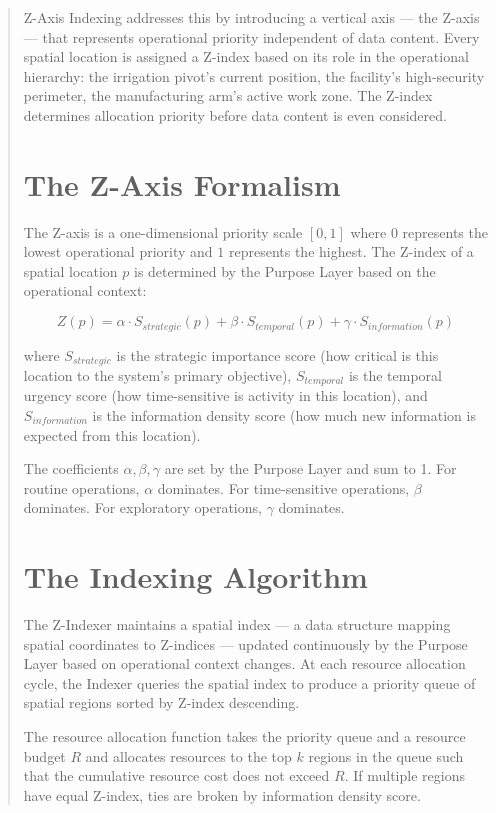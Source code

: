 \documentclass[12pt]{article}
\begin{document}
\begin{abstract}
Z-Axis Indexing addresses this by introducing a vertical axis — the Z-axis — that represents operational priority independent of data content. Every spatial location is assigned a Z-index based on its role in the operational hierarchy: the irrigation pivot's current position, the facility's high-security perimeter, the manufacturing arm's active work zone. The Z-index determines allocation priority before data content is even considered.

\section{The Z-Axis Formalism}
The Z-axis is a one-dimensional priority scale $[0, 1]$ where $0$ represents the lowest operational priority and $1$ represents the highest. The Z-index of a spatial location $p$ is determined by the Purpose Layer based on the operational context:

$$Z(p) = \alpha \cdot S_{strategic}(p) + \beta \cdot S_{temporal}(p) + \gamma \cdot S_{information}(p)$$

where $S_{strategic}$ is the strategic importance score (how critical is this location to the system's primary objective), $S_{temporal}$ is the temporal urgency score (how time-sensitive is activity in this location), and $S_{information}$ is the information density score (how much new information is expected from this location).

The coefficients $\alpha, \beta, \gamma$ are set by the Purpose Layer and sum to 1. For routine operations, $\alpha$ dominates. For time-sensitive operations, $\beta$ dominates. For exploratory operations, $\gamma$ dominates.

\section{The Indexing Algorithm}
The Z-Indexer maintains a spatial index — a data structure mapping spatial coordinates to Z-indices — updated continuously by the Purpose Layer based on operational context changes. At each resource allocation cycle, the Indexer queries the spatial index to produce a priority queue of spatial regions sorted by Z-index descending.

The resource allocation function takes the priority queue and a resource budget $R$ and allocates resources to the top $k$ regions in the queue such that the cumulative resource cost does not exceed $R$. If multiple regions have equal Z-index, ties are broken by information density score.


\end{abstract}
\end{document}
